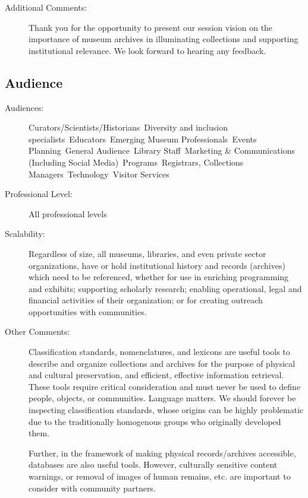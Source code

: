 \documentclass{report}
\begin{document}
\begin{description}
                    \item [Additional Comments: ]Thank you for the opportunity to present our session vision on the importance of museum archives in illuminating collections and supporting institutional relevance. We look forward to hearing any feedback.

                \end{description}
              \subsection*{Audience}
                \begin{description}
                  \item [Audiences:]Curators/Scientists/Historians~Diversity and inclusion specialists~Educators~Emerging Museum Professionals~Events Planning~General Audience~Library Staff~Marketing \& Communications (Including Social Media)~Programs~Registrars, Collections Managers~Technology~Visitor Services~
                  \item[Professional Level:]All professional levels~
                \item[Scalability:] Regardless of size, all museums, libraries, and even private sector organizations, have or hold institutional history and records (archives) which need to be referenced, whether for use in enriching programming and exhibits; supporting scholarly research; enabling operational, legal and financial activities of their organization; or for creating outreach opportunities with communities.

							
              \item[Other Comments:] Classification standards, nomenclatures, and lexicons are useful tools to describe and organize collections and archives for the purpose of physical and cultural preservation, and efficient, effective information retrieval. These tools require critical consideration and must never be used to define people, objects, or communities. Language matters. We should forever be inspecting classification standards, whose origins can be highly problematic due to the traditionally homogenous groups who originally developed them.

Further, in the framework of making physical records/archives accessible, databases are also useful tools. However, culturally sensitive content warnings, or removal of images of human remains, etc. are important to consider with community partners.
              \end{description}
\end{document}
